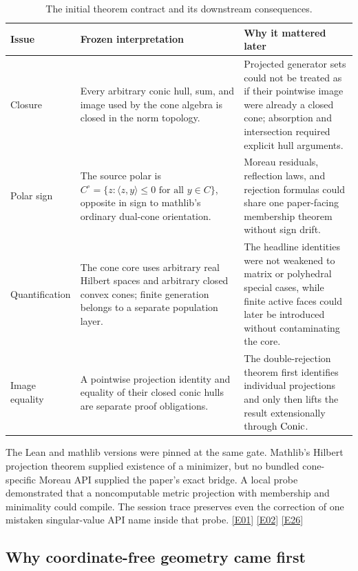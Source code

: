 \documentclass[11pt,a4paper]{article}
\newcommand{\ev}[1]{%
  \hyperref[ev:#1]{\textcolor{ReportBlue}{\textsf{\scriptsize[#1]}}}}
\begin{document}
\begin{table}[htbp]
\centering
\caption{The initial theorem contract and its downstream consequences.}
\label{tab:initial-contract}
\begin{tabularx}{\linewidth}{@{}L{27mm}L{48mm}Y@{}}
\toprule
\textbf{Issue} & \textbf{Frozen interpretation} & \textbf{Why it mattered later} \\
\midrule
Closure &
Every arbitrary conic hull, sum, and image used by the cone algebra is closed in the
norm topology. &
Projected generator sets could not be treated as if their pointwise image were
already a closed cone; absorption and intersection required explicit hull arguments. \\
Polar sign &
The source polar is
\(C^\circ=\{z:\langle z,y\rangle\leq0\text{ for all }y\in C\}\), opposite in sign
to mathlib's ordinary dual-cone orientation. &
Moreau residuals, reflection laws, and rejection formulas could share one
paper-facing membership theorem without sign drift. \\
Quantification &
The cone core uses arbitrary real Hilbert spaces and arbitrary closed convex cones;
finite generation belongs to a separate population layer. &
The headline identities were not weakened to matrix or polyhedral special cases,
while finite active faces could later be introduced without contaminating the core. \\
Image equality &
A pointwise projection identity and equality of their closed conic hulls are separate
proof obligations. &
The double-rejection theorem first identifies individual projections and only then
lifts the result extensionally through \(\operatorname{Conic}\). \\
\bottomrule
\end{tabularx}
\end{table}

The Lean and mathlib versions were pinned at the same gate. Mathlib's Hilbert
projection theorem supplied existence of a minimizer, but no bundled cone-specific
Moreau API supplied the paper's exact bridge. A local probe demonstrated that a
noncomputable metric projection with membership and minimality could compile. The
session trace preserves even the correction of one mistaken singular-value API name
inside that probe. \ev{E01}\ev{E02}\ev{E26}

\subsection{Why coordinate-free geometry came first}
\end{document}

